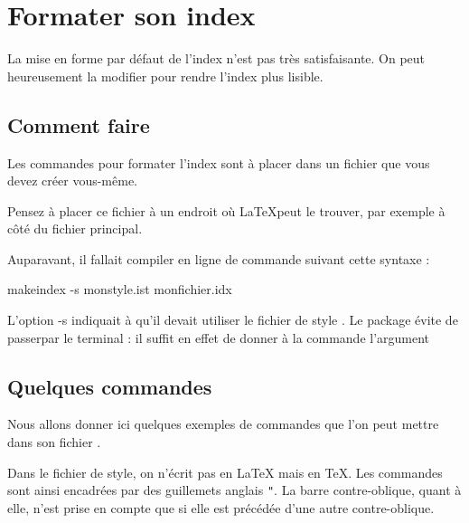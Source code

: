 \chapter{Formater son index}\label{styleindex}

\begin{intro}
La mise en forme par défaut de l'index n'est pas très satisfaisante. On peut heureusement la modifier pour rendre l'index plus lisible.
\end{intro}

\section{Comment faire}
Les commandes pour formater l'index sont à placer dans un fichier  que vous devez créer vous-même.

\begin{attention}
Pensez à placer ce fichier à un endroit où \LaTeX peut le trouver, par exemple à côté du fichier principal.
\end{attention}

Auparavant, il fallait compiler en ligne de commande suivant cette syntaxe :

\begin{bashcode}
makeindex -s monstyle.ist monfichier.idx
\end{bashcode}

L'option -s indiquait  à   qu'il devait utiliser le fichier de style .
Le package   évite de passerpar le terminal : il suffit en effet de  donner à la commande  l'argument 



\section{Quelques commandes}

Nous allons donner ici quelques exemples de commandes que l'on peut mettre dans son fichier . 

\begin{attention}
Dans le fichier de style, on n'écrit pas en \LaTeX{} mais en \TeX . Les commandes sont ainsi encadrées par des guillemets anglais \verb|"|. La barre contre-oblique, quant à elle, n'est prise en compte que si elle est précédée d'une autre contre-oblique.
\end{attention}

